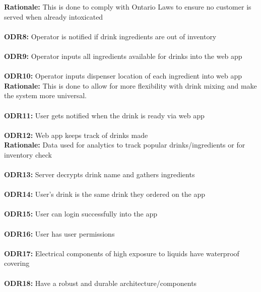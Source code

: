 \documentclass{article}
\begin{document}
    \textbf{Rationale:} This is done to comply with Ontario Laws to ensure no customer is served when already intoxicated\\\\
    \textbf{ODR8:} Operator is notified if drink ingredients are out of inventory\\\\
    \textbf{ODR9:} Operator inputs all ingredients available for drinks into the web app\\\\
    \textbf{ODR10:} Operator inputs dispenser location of each ingredient into web app\\

    \textbf{Rationale:} This is done to allow for more flexibility with drink mixing and make the system more universal.\\\\
    \textbf{ODR11:} User gets notified when the drink is ready via web app\\\\
    \textbf{ODR12:} Web app keeps track of drinks made\\

    \textbf{Rationale:} Data used for analytics to track popular drinks/ingredients or for inventory check\\\\
    \textbf{ODR13:} Server decrypts drink name and gathers ingredients\\\\
    \textbf{ODR14:} User's drink is the same drink they ordered on the app \\\\
    \textbf{ODR15:} User can login successfully into the app \\\\
    \textbf{ODR16:} User has user permissions  \\\\
    \textbf{ODR17:} Electrical components of high exposure to liquids have waterproof covering\\\\
    \textbf{ODR18:} Have a robust and durable architecture/components
\end{document}
